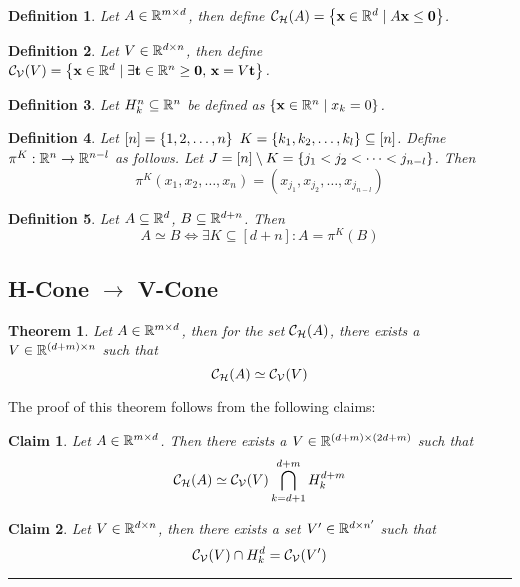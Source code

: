 \documentclass[a4,fleqn]{article}
\newtheorem{thm}{Theorem}
\newtheorem{claim}{Claim}
\newtheorem{definition}{Definition}
\begin{document}
\begin{definition}{
  Let $A \in \mathbb{R}^{m \times d}$, then define $\mathcal{C}_{\mathcal{H}}(A) = \left\{\mathbf{x} \in \mathbb{R}^d \;|\; A\mathbf{x} \leq \mathbf{0}\right\}$.
} \end{definition}

\begin{definition}{
  Let $V \in \mathbb{R}^{d \times n}$, then define $\mathcal{C}_{\mathcal{V}}(V) = \left\{\mathbf{x} \in \mathbb{R}^d \;|\; \exists \mathbf{t} \in\mathbb{R}^n\geq \mathbf{0},\, \mathbf{x} = V\mathbf{t}\right\}$.
} \end{definition}

\begin{definition}{
  Let $H_{k}^{n} \subseteq \mathbb{R}^n$ be defined as $\left\{\mathbf{x} \in \mathbb{R}^{n} \;|\; x_{k} = 0\right\}$.
} \end{definition}

\begin{definition}{
  Let $[n] = \left\{1,2,\dots,n\right\}$ $K = \left\{k_1,k_2,\dots,k_l\right\} \subseteq [n]$.  Define $\pi^K : \mathbb{R}^n \to \mathbb{R}^{n-l}$ as follows.  Let $J = [n] \setminus K = \left\{j_1 < j_2 < \dots < j_{n-l}\right\}$. Then
  \[ \pi^K(x_1,x_2,\dots,x_n) = (x_{j_1},x_{j_2},\dots,x_{j_{n-l}})\]
} \end{definition}

\begin{definition}{
Let $A \subseteq \mathbb{R}^d$, $B \subseteq \mathbb{R}^{d+n}$.  Then
   \[ A \simeq B \Leftrightarrow \exists K \subseteq [d+n] : A = \pi^K(B) \]
} \end{definition}

\subsection {H-Cone $\to$ V-Cone}

\begin{thm}{\label{thm:htov}
  Let $A \in \mathbb{R}^{m \times d}$, then for the set $\mathcal{C}_{\mathcal{H}}(A)$, there exists a ${V \in \mathbb{R}^{(d+m) \times n}}$ such that 
  \[\mathcal{C}_{\mathcal{H}}(A) \simeq \mathcal{C}_{\mathcal{V}}(V)\]
} \end{thm}

The proof of this theorem follows from the following claims:
\begin{claim}{\label{claim:htovlift}
  Let $A \in \mathbb{R}^{m \times d}$.  Then there exists a $V \in \mathbb{R}^{(d+m) \times (2d+m)}$ such that 
  \[\mathcal{C}_{\mathcal{H}}(A) \simeq \mathcal{C}_{\mathcal{V}}(V) \bigcap_{k=d+1}^{d+m} H_k^{d+m}\]
} \end{claim}

\begin{claim}{\label{claim:htovdrop}
  Let $V \in \mathbb{R}^{d \times n}$, then there exists a set $V' \in \mathbb{R}^{d \times n'}$ such that
 \[ \mathcal{C}_{\mathcal{V}}(V) \cap H_{k}^{d} = \mathcal{C}_{\mathcal{V}}(V') \]
} \end{claim}

\bigskip \hrule
\end{document}
